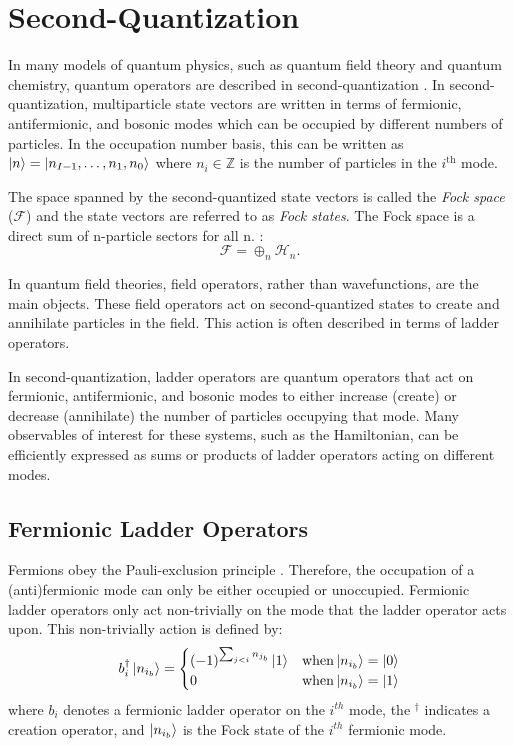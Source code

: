 \section{Second-Quantization}
\label{sec:theory}

In many models of quantum physics, such as quantum field theory and quantum chemistry, quantum operators are described in second-quantization \cite{Sakurai_Napolitano_2020}.
In second-quantization, multiparticle state vectors are written in terms of fermionic, antifermionic, and bosonic modes which can be occupied by different numbers of particles.
In the occupation number basis, this can be written as $\ket{n} = \ket{n_{I-1}, \dots, n_1, n_0}$ where $n_i \in \mathbb{Z}$ is the number of particles in the $i^\text{th}$ mode.

The space spanned by the second-quantized state vectors is called the \textit{Fock space} ($\mathcal{F}$) and the state vectors are referred to as \textit{Fock states}.
The Fock space is a direct sum of n-particle sectors for all n. \cite{Schwartz_2013}:
\begin{equation}
    \mathcal{F} = \oplus_n \mathcal{H}_n.
\end{equation}

In quantum field theories, field operators, rather than wavefunctions, are the main objects.
These field operators act on second-quantized states to create and annihilate particles in the field.
This action is often described in terms of ladder operators.

In second-quantization, ladder operators are quantum operators that act on fermionic, antifermionic, and bosonic modes to either increase (create) or decrease (annihilate) the number of particles occupying that mode.
Many observables of interest for these systems, such as the Hamiltonian, can be efficiently expressed as sums or products of ladder operators acting on different modes.

\subsection{Fermionic Ladder Operators}
\label{subsec:fermionic-operators}

Fermions obey the Pauli-exclusion principle \cite{pauli1925zusammenhang}.
Therefore, the occupation of a (anti)fermionic mode can only be either occupied or unoccupied.
Fermionic ladder operators only act non-trivially on the mode that the ladder operator acts upon.
This non-trivially action is defined by:
\begin{equation}
    \label{eq:fermionic-creation}
    b_i^\dagger \ket{n_{i_b}} = 
    \begin{cases} 
        (-1)^{\sum_{j < i} n_{j_b}} \ket{1}  & {\rm when} \ket{n_{i_b}} = \ket{0} \\
        0 & {\rm when} \ket{n_{i_b}} = \ket{1}
    \end{cases}
\end{equation}
where $b_i$ denotes a fermionic ladder operator on the $i^{th}$ mode, the $^\dagger$ indicates a creation operator, and $\ket{n_{i_b}}$ is the Fock state of the $i^{th}$ fermionic mode.

